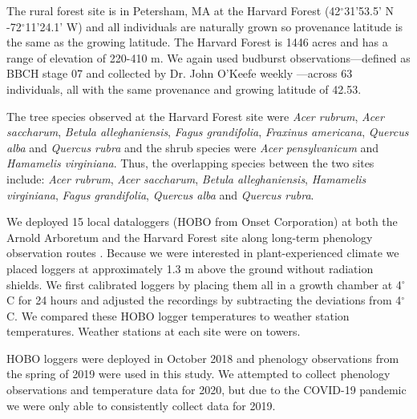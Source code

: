 \documentclass{article}\usepackage[]{graphicx}\usepackage[]{color}
\begin{document}
The rural forest site is in Petersham, MA at the Harvard Forest (42$^{\circ}$31'53.5' N -72$^{\circ}$11'24.1' W) and all individuals are naturally grown so provenance latitude is the same as the growing latitude. The Harvard Forest is 1446 acres and has a range of elevation of 220-410 m. We again used budburst observations---defined as BBCH stage 07 and collected by Dr. John O'Keefe weekly \citep{OKeefe2014}---across 63 individuals, all with the same provenance and growing latitude of 42.53. 

The tree species observed at the Harvard Forest site were \textit{Acer rubrum}, \textit{Acer saccharum}, \textit{Betula alleghaniensis},  \textit{Fagus grandifolia}, \textit{Fraxinus americana}, \textit{Quercus alba} and \textit{Quercus rubra} and the shrub species were \textit{Acer pensylvanicum} and \textit{Hamamelis virginiana}. Thus, the overlapping species between the two sites include: \textit{Acer rubrum}, \textit{Acer saccharum}, \textit{Betula alleghaniensis}, \textit{Hamamelis virginiana}, \textit{Fagus grandifolia}, \textit{Quercus alba} and \textit{Quercus rubra}.

We deployed 15 local dataloggers (HOBO from Onset Corporation) at both the Arnold Arboretum and the Harvard Forest site along long-term phenology observation routes \citep{OKeefe2014, Denny2014}. Because we were interested in plant-experienced climate we placed loggers at approximately 1.3 m above the ground without radiation shields. We first calibrated loggers by placing them all in a growth chamber at 4$^{\circ}$C for 24 hours and adjusted the recordings by subtracting the deviations from 4$^{\circ}$C. We compared these HOBO logger temperatures to weather station temperatures. Weather stations at each site were on towers.

HOBO loggers were deployed in October 2018 and phenology observations from the spring of 2019 were used in this study. We attempted to collect phenology observations and temperature data for 2020, but due to the COVID-19 pandemic we were only able to consistently collect data for 2019. 
\end{document}
